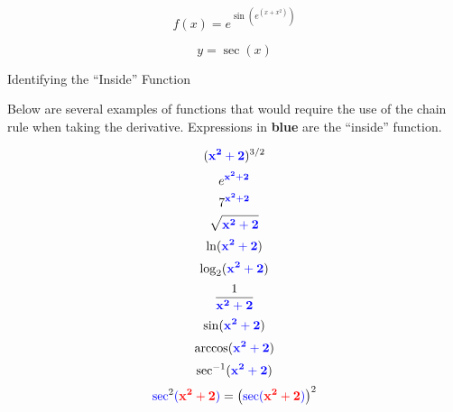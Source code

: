 \documentclass{siproblemset}
\newcommand{\inside}{\mathbf{\color{blue} x^2+2}}
\begin{document}
    $$f(x)=e^{\sin\left(e^{\left(x+x^2\right)}\right)}$$
    \Hugesp
    
    $$y=\sec(x)$$
    \newpage
    
    \thispagestyle{empty} 
    \begin{center}
        {\Large Identifying the ``Inside'' Function}
        
        {\large Below are several examples of functions that would require the use of the chain rule when taking the derivative. Expressions in \textbf{\color{blue} blue} are the ``inside'' function.}
    \end{center}
    \tinysp

    \Large
    \begin{multicols}{3}\noindent
        $$(\inside)^{3/2}$$
        \tinysp
        $$e^{\inside}$$
        \tinysp
        $$7^{\inside}$$
        \tinysp
        $$\sqrt{\inside}$$
        \columnbreak
        $$\ln(\inside)$$
        \tinysp
        $$\log_2(\inside)$$
        \tinysp
        $$\dfrac{1}{\inside}$$
        \columnbreak
        $$\sin(\inside)$$
        \tinysp
        $$\arccos(\inside)$$
        \tinysp
        $$\sec^{-1}(\inside)$$
        \tinysp
        $$\mathbf{\color{blue}\sec}^2\mathbf{\color{blue}(}\mathbf{\color{red}x^2+2}\mathbf{\color{blue})}=\left(\mathbf{\color{blue}\sec(}\mathbf{\color{red}x^2+2}\mathbf{\color{blue})}\right)^2$$
    \end{multicols}
\end{document}
